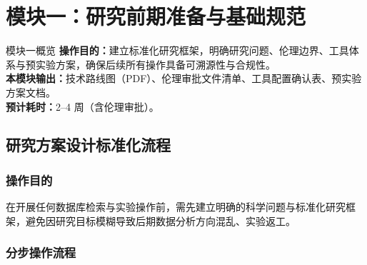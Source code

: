 \documentclass[12pt,a4paper,twoside]{article}
\begin{document}
\clearpage

\section{模块一：研究前期准备与基础规范}
\label{sec:module1}

\begin{infobox}{模块一概览}
\textbf{操作目的：}建立标准化研究框架，明确研究问题、伦理边界、工具体系与预实验方案，确保后续所有操作具备可溯源性与合规性。\\
\textbf{本模块输出：}技术路线图（PDF）、伦理审批文件清单、工具配置确认表、预实验方案文档。\\
\textbf{预计耗时：}2--4 周（含伦理审批）。
\end{infobox}

\subsection{研究方案设计标准化流程}
\label{sec:module1_design}

\subsubsection{操作目的}

在开展任何数据库检索与实验操作前，需先建立明确的科学问题与标准化研究框架，避免因研究目标模糊导致后期数据分析方向混乱、实验返工。

\subsubsection{分步操作流程}
\end{document}
